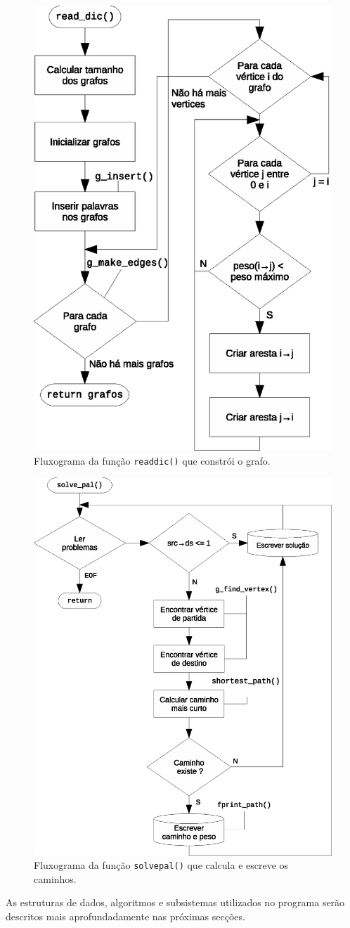 \documentclass[portuguese, a4paper]{article}
\newcommand\tu[0]{\textunderscore}
\begin{document}
	\begin{figure}[H]
		\centering
		\includegraphics[width=0.70\linewidth]{read_dic}
		\caption{Fluxograma da função \texttt{read\tu dic()} que constrói o grafo.}
	\end{figure}
	\begin{figure}[H]
		\centering
		\includegraphics[width=0.70\linewidth]{solve_pal}
		\caption{Fluxograma da função \texttt{solve\tu pal()} que calcula e
		escreve os caminhos.}
	\end{figure}
	\par
	As estruturas de dados, algoritmos e subsistemas utilizados no programa
	serão descritos mais aprofundadamente nas próximas secções.
\end{document}

